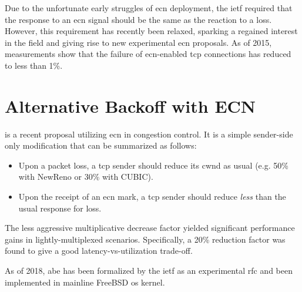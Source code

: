 Due to the unfortunate early struggles of \gls{ecn} deployment, the \gls{ietf} required that the response to an \gls{ecn} signal should be the same as the reaction to a loss. \cite{rfc3168} However, this requirement has recently been relaxed, \cite{rfc8311} sparking a regained interest in the field and giving rise to new experimental \gls{ecn} proposals. As of 2015, measurements show that the failure of \gls{ecn}-enabled \gls{tcp} connections has reduced to less than 1\%. \cite{enabling_internet-wide_ecn}





\section{Alternative Backoff with ECN}

 \cite{abe} is a recent proposal utilizing \gls{ecn} in congestion control. It is a simple sender-side only modification that can be summarized as follows:

\begin{itemize}
    \item Upon a packet loss, a \gls{tcp} sender should reduce its \gls{cwnd} as usual (e.g. 50\% with NewReno or 30\% with CUBIC).
    \item Upon the receipt of an \gls{ecn} mark, a \gls{tcp} sender should reduce \textit{less} than the usual response for loss.
\end{itemize}

The less aggressive multiplicative decrease factor yielded significant performance gains in lightly-multiplexed scenarios. Specifically, a 20\% reduction factor was found to give a good latency-vs-utilization trade-off.

As of 2018, \gls{abe} has been formalized by the \gls{ietf} as an experimental \gls{rfc} \cite{rfc8511} and been implemented in mainline FreeBSD \gls{os} kernel.
